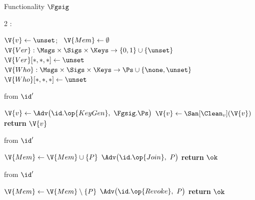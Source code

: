 \begin{interface}[nofloat]{Functionality $\Fgsig$ \\
}

{\scriptsize
\setlength{\columnsep}{1.4em}
\begin{multicols}{2}
:
\begin{algorithmic}[1]
\setcounter{contline}{0}\algcont
\State $\V{v} \gets \unset$; \ $\V{Mem} \gets \emptyset$
\State $\V{Ver} : \Msgs \times \Sigs \times \Keys \to \{0,1\} \cup \{\unset\}$
\State $\V{Ver}[*,*,*] \gets \unset$
\State $\V{Who} : \Msgs \times \Sigs \times \Keys \to \Ps \cup \{\none, \unset\}$
\State $\V{Who}[*,*,*] \gets \unset$
\algsave
\end{algorithmic}
\vspace{1.4ex}

 \quad from $\id'$
\begin{algorithmic}[1]
\algcont
{} \label{ln:gsmanager}
\State $\V{v} \gets \Adv\bigl(\id.\op{KeyGen},\ \Fgsig.\Ps\bigr)$ \label{ln:gskey}
\State $\V{v} \gets \San[\Clean_{v}](\V{v})$
\State \textbf{return} $\V{v}$
\algsave
\end{algorithmic}
\vspace{1.4ex}

 \quad from $\id'$
\begin{algorithmic}[1]
\algcont
{}
\State $\V{Mem} \gets \V{Mem} \cup \{P\}$
\State $\Adv\bigl(\id.\op{Join},\ P\bigr)$ \label{ln:gsjoinleak}
\State \textbf{return} $\ok$
\algsave
\end{algorithmic}
\vspace{1.4ex}

 \quad from $\id'$
\begin{algorithmic}[1]
\algcont
{}
\State $\V{Mem} \gets \V{Mem} \setminus \{P\}$
\State $\Adv\bigl(\id.\op{Revoke},\ P\bigr)$
\State \textbf{return} $\ok$
\algsave
\end{algorithmic}
\vspace{1.4ex}


\end{multicols}}
\end{interface}

